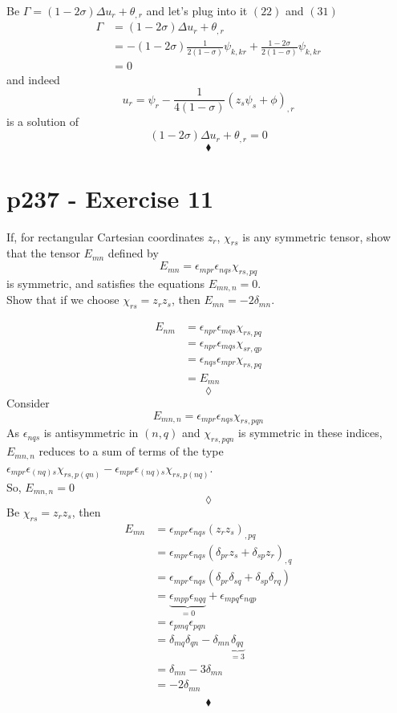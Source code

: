 Be $\Gamma= \left(1-2\sigma\right)\Delta u_r+\theta_{,r}$ and let's plug into it $(22)$ and $(31)$
\begin{align}
\Gamma&= \left(1-2\sigma\right)\Delta u_r+\theta_{,r}\\
&= -\left(1-2\sigma\right)\frac{1}{2\left(1-\sigma\right)} \psi_{k,kr}+\frac{1-2\sigma}{2\left(1-\sigma\right)}\psi_{k,kr}\\
&=0
\end{align}
and indeed $$u_r=\psi_r-\frac{1}{4\left(1-\sigma\right)}\left(z_s\psi_s+\phi\right)_{,r}$$ is a solution of $$\left(1-2\sigma\right)\Delta u_r+\theta_{,r}=0$$
$$\blacklozenge$$
\newpage


\section{p237 - Exercise 11}
\begin{tcolorbox}
If, for rectangular Cartesian coordinates $z_r$, $\chi_{rs}$ is any symmetric tensor, show that the tensor $E_{mn}$ defined by
$$E_{mn}= \epsilon_{mpr}\epsilon_{nqs}\chi_{rs,pq}$$
is symmetric, and satisfies the equations $E_{mn,n}= 0$.\\ Show that if we choose $\chi_{rs}= z_rz_s$, then $E_{mn}= -2\delta_{mn}$.
\end{tcolorbox}
\begin{align}
E_{nm}&= \epsilon_{npr}\epsilon_{mqs}\chi_{rs,pq}\\
&= \epsilon_{npr}\epsilon_{mqs}\chi_{sr,qp}\\
&= \epsilon_{nqs}\epsilon_{mpr}\chi_{rs,pq}\\
&= E_{mn}
\end{align}
$$\lozenge$$
Consider $$E_{mn,n}= \epsilon_{mpr}\epsilon_{nqs}\chi_{rs,pqn}$$
As $\epsilon_{nqs}$ is antisymmetric in $(n,q)$ and $\chi_{rs,pqn}$ is symmetric in these indices,  $E_{mn,n}$ reduces to a sum of terms of the type $\epsilon_{mpr}\epsilon_{(nq)s}\chi_{rs,p(qn)}-\epsilon_{mpr}\epsilon_{(nq)s}\chi_{rs,p(nq)}$.\\
So, $E_{mn,n}=0$
$$\lozenge$$
Be $\chi_{rs}= z_rz_s$, then
\begin{align}
E_{mn}&= \epsilon_{mpr}\epsilon_{nqs}(z_rz_s)_{,pq}\\
&= \epsilon_{mpr}\epsilon_{nqs}(\delta_{pr}z_s+\delta_{sp}z_r)_{,q}\\
&= \epsilon_{mpr}\epsilon_{nqs}(\delta_{pr}\delta_{sq}+\delta_{sp}\delta_{rq})\\
&= \underbrace{\epsilon_{mpp}\epsilon_{nqq}}_{=0}+\epsilon_{mpq}\epsilon_{nqp}\\
&= \epsilon_{pmq}\epsilon_{pqn}\\
&= \delta_{mq}\delta_{qn}-\delta_{mn}\underbrace{\delta_{qq}}_{=3}\\
&= \delta_{mn}-3\delta_{mn}\\
&= -2\delta_{mn}\\
\end{align}
$$\blacklozenge$$
\newpage
